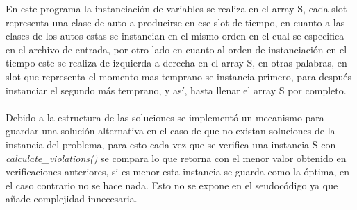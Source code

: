 \documentclass[letter, 10pt]{article}
\begin{document}
En este programa la instanciaci\'on de variables se realiza en el array S, cada slot representa una clase de auto a producirse en ese slot de tiempo, en cuanto a las clases de los autos estas se instancian en el mismo orden en el cual se especifica en el archivo de entrada, por otro lado en cuanto al orden de instanciaci\'on en el tiempo este se realiza de izquierda a derecha en el array S, en otras palabras, en slot que representa el momento mas temprano se instancia primero, para despu\'es instanciar el segundo m\'as temprano, y as\'i, hasta llenar el array S por completo.
\\\\
Debido a la estructura de las soluciones se implement\'o un mecanismo para guardar una soluci\'on alternativa en el caso de que no existan soluciones de la instancia del problema, para esto cada vez que se verifica una instancia S con \textit{calculate\_violations()} se compara lo que retorna con el menor valor obtenido en verificaciones anteriores, si es menor esta instancia se guarda como la \'optima, en el caso contrario no se hace nada. Esto no se expone en el seudoc\'odigo ya que a\~{n}ade complejidad innecesaria.
\end{document}
